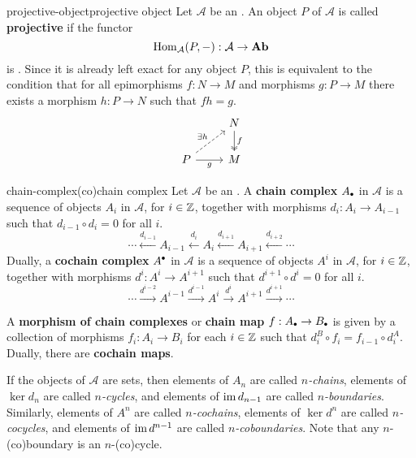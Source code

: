 \begin{topic}{projective-object}{projective object}
    Let $\mathcal{A}$ be an . An object $P$ of $\mathcal{A}$ is called \textbf{projective} if the functor
    \[ \operatorname{Hom}_\mathcal{A}(P, -) : \mathcal{A} \to \textbf{Ab} \]
    is . Since it is already left exact for any object $P$, this is equivalent to the condition that for all epimorphisms $f : N \to M$ and morphisms $g : P \to M$ there exists a morphism $h : P \to N$ such that $fh = g$.
    \[ \begin{tikzcd} & N \arrow[twoheadrightarrow]{d}{f} \\ P \arrow[swap]{r}{g} \arrow[dashed]{ur}{\exists h} & M \end{tikzcd} \]
\end{topic}

\begin{topic}{chain-complex}{(co)chain complex}
    Let $\mathcal{A}$ be an . A \textbf{chain complex} $A_\bdot$ in $\mathcal{A}$ is a sequence of objects $A_i$ in $\mathcal{A}$, for $i \in \mathbb{Z}$, together with morphisms $d_i : A_i \to A_{i - 1}$ such that $d_{i - 1} \circ d_i = 0$ for all $i$.
    \[ \cdots \xleftarrow{d_{i - 1}} A_{i - 1} \xleftarrow{d_i} A_i \xleftarrow{d_{i + 1}} A_{i + 1} \xleftarrow{d_{i + 2}} \cdots \]
    Dually, a \textbf{cochain complex} $A^\bdot$ in $\mathcal{A}$ is a sequence of objects $A^i$ in $\mathcal{A}$, for $i \in \mathbb{Z}$, together with morphisms $d^i : A^i \to A^{i + 1}$ such that $d^{i + 1} \circ d^i = 0$ for all $i$.
    \[ \cdots \xrightarrow{d^{i - 2}} A^{i - 1} \xrightarrow{d^{i - 1}} A^i \xrightarrow{d^i} A^{i + 1} \xrightarrow{d^{i + 1}} \cdots \]
    
    A \textbf{morphism of chain complexes} or \textbf{chain map} $f : A_\bdot \to B_\bdot$ is given by a collection of morphisms $f_i : A_i \to B_i$ for each $i \in \mathbb{Z}$ such that $d^B_i \circ f_i = f_{i - 1} \circ d^A_i$. Dually, there are \textbf{cochain maps}.
    
    If the objects of $\mathcal{A}$ are sets, then elements of $A_n$ are called \textit{$n$-chains}, elements of $\ker d_n$ are called \textit{$n$-cycles}, and elements of $\operatorname{im} d_{n - 1}$ are called \textit{$n$-boundaries}. Similarly, elements of $A^n$ are called \textit{$n$-cochains}, elements of $\ker d^n$ are called \textit{$n$-cocycles}, and elements of $\operatorname{im} d^{n - 1}$ are called \textit{$n$-coboundaries}. Note that any $n$-(co)boundary is an $n$-(co)cycle.
\end{topic}


